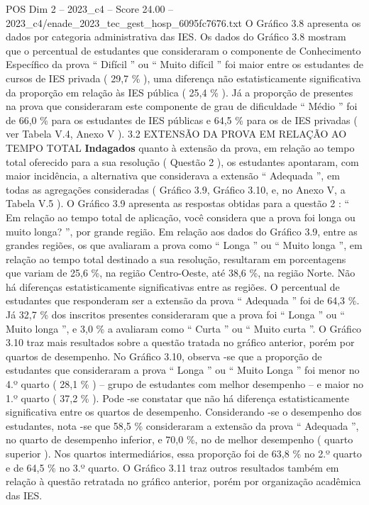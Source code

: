 \begin{textsample}{POS Dim 2 – 2023\_c4 – Score 24.00 – 2023\_c4/enade\_2023\_tec\_gest\_hosp\_6095fc7676.txt}
O Gráfico 3.8 apresenta os dados por categoria administrativa das IES.
Os dados do Gráfico 3.8 mostram que o percentual de estudantes que consideraram o componente de Conhecimento Específico da prova “ Difícil ” ou “ Muito difícil ” foi maior entre os estudantes de cursos de IES privada ( 29,7 \% ), uma diferença não estatisticamente significativa da proporção em relação às IES pública ( 25,4 \% ).
Já a proporção de presentes na prova que consideraram este componente de grau de dificuldade “ Médio ” foi de 66,0 \% para os estudantes de IES públicas e 64,5 \% para os de IES privadas ( ver Tabela V.4, Anexo V ). 3.2 EXTENSÃO DA PROVA EM RELAÇÃO AO TEMPO TOTAL \textbf{Indagados} quanto à extensão da prova, em relação ao tempo total oferecido para a sua resolução ( Questão 2 ), os estudantes apontaram, com maior incidência, a alternativa que considerava a extensão “ Adequada ”, em todas as agregações consideradas ( Gráfico 3.9, Gráfico 3.10, e, no Anexo V, a Tabela V.5 ).
O Gráfico 3.9 apresenta as respostas obtidas para a questão 2 : “ Em relação ao tempo total de aplicação, você considera que a prova foi longa ou muito longa? ”, por grande região.
Em relação aos dados do Gráfico 3.9, entre as grandes regiões, os que avaliaram a prova como “ Longa ” ou “ Muito longa ”, em relação ao tempo total destinado a sua resolução, resultaram em porcentagens que variam de 25,6 \%, na região Centro-Oeste, até 38,6 \%, na região Norte.
Não há diferenças estatisticamente significativas entre as regiões.
O percentual de estudantes que responderam ser a extensão da prova “ Adequada ” foi de 64,3 \%.
Já 32,7 \% dos inscritos presentes consideraram que a prova foi “ Longa ” ou “ Muito longa ”, e 3,0 \% a avaliaram como “ Curta ” ou “ Muito curta ”.
O Gráfico 3.10 traz mais resultados sobre a questão tratada no gráfico anterior, porém por quartos de desempenho.
No Gráfico 3.10, observa -se que a proporção de estudantes que consideraram a prova “ Longa ” ou “ Muito Longa ” foi menor no 4.º quarto ( 28,1 \% ) – grupo de estudantes com melhor desempenho – e maior no 1.º quarto ( 37,2 \% ).
Pode -se constatar que não há diferença estatisticamente significativa entre os quartos de desempenho.
Considerando -se o desempenho dos estudantes, nota -se que 58,5 \% consideraram a extensão da prova “ Adequada ”, no quarto de desempenho inferior, e 70,0 \%, no de melhor desempenho ( quarto superior ).
Nos quartos intermediários, essa proporção foi de 63,8 \% no 2.º quarto e de 64,5 \% no 3.º quarto.
O Gráfico 3.11 traz outros resultados também em relação à questão retratada no gráfico anterior, porém por organização acadêmica das IES.

\end{textsample}
